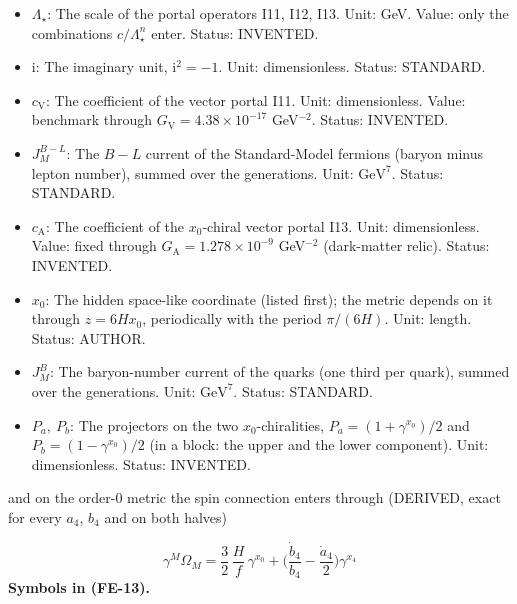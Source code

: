 \documentclass[
  10pt,
]{article}
\begin{document}
\begin{itemize}
  \(\mathcal{F} = c_{\mathrm{G}}G^A_{MN}G^{AMN} + c_{\mathrm{W}}W^I_{MN}W^{IMN} + c_{\mathrm{B}}B_{MN}B^{MN}\);
  \(\langle\mathcal{F}\rangle\) its mean value in an environment. Unit:
  \(\mathrm{GeV}^{4}\). Status: INVENTED.
\item
  \(\Lambda_\star\): The scale of the portal operators I11, I12, I13.
  Unit: GeV. Value: only the combinations \(c/\Lambda_\star^n\) enter.
  Status: INVENTED.
\item
  \(\mathrm{i}\): The imaginary unit, \(\mathrm{i}^2 = -1\). Unit:
  dimensionless. Status: STANDARD.
\item
  \(c_{\mathrm{V}}\): The coefficient of the vector portal I11. Unit:
  dimensionless. Value: benchmark through
  \(G_{\mathrm{V}} = 4.38\times10^{-17}\) GeV\(^{-2}\). Status:
  INVENTED.
\item
  \(J^{B-L}_M\): The \(B - L\) current of the Standard-Model fermions
  (baryon minus lepton number), summed over the generations. Unit:
  \(\mathrm{GeV}^{7}\). Status: STANDARD.
\item
  \(c_{\mathrm{A}}\): The coefficient of the \(x_0\)-chiral vector
  portal I13. Unit: dimensionless. Value: fixed through
  \(G_{\mathrm{A}} = 1.278\times10^{-9}\) GeV\(^{-2}\) (dark-matter
  relic). Status: INVENTED.
\item
  \(x_0\): The hidden space-like coordinate (listed first); the metric
  depends on it through \(z = 6Hx_0\), periodically with the period
  \(\pi/(6H)\). Unit: length. Status: AUTHOR.
\item
  \(J^{B}_M\): The baryon-number current of the quarks (one third per
  quark), summed over the generations. Unit: \(\mathrm{GeV}^{7}\).
  Status: STANDARD.
\item
  \(P_a,\ P_b\): The projectors on the two \(x_0\)-chiralities,
  \(P_a = (1 + \gamma^{x_0})/2\) and \(P_b = (1 - \gamma^{x_0})/2\) (in
  a block: the upper and the lower component). Unit: dimensionless.
  Status: INVENTED.
\end{itemize}

and on the order-0 metric the spin connection enters through (DERIVED,
exact for every \(a_4\), \(b_4\) and on both halves)

\[
\gamma^M\Omega_M = \frac32\,\frac{H}{f}\,\gamma^{x_0} + \Big(\frac{\dot b_4}{b_4} - \frac{\dot
 a_4}{2}\Big)\gamma^{x_4} \tag{FE-13}
\] \textbf{Symbols in (FE-13).}
\end{document}
